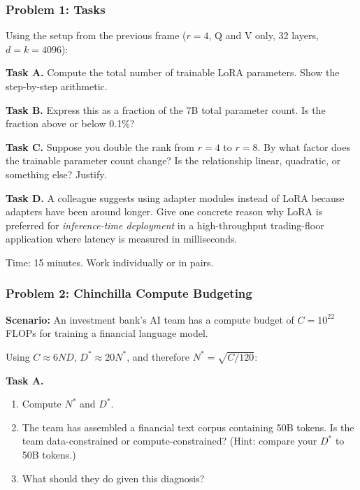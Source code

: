 \documentclass[9pt,t]{beamer}
\begin{document}
\begin{frame}
\frametitle{Problem 1: Tasks}

Using the setup from the previous frame ($r=4$, Q and V only, 32 layers, $d=k=4096$):

\medskip
\textbf{Task A.} Compute the total number of trainable LoRA parameters.
Show the step-by-step arithmetic.

\medskip
\textbf{Task B.} Express this as a fraction of the 7B total parameter count.
Is the fraction above or below 0.1\%?

\medskip
\textbf{Task C.} Suppose you double the rank from $r = 4$ to $r = 8$.
By what factor does the trainable parameter count change?
Is the relationship linear, quadratic, or something else? Justify.

\medskip
\textbf{Task D.} A colleague suggests using adapter modules instead of LoRA
because adapters have been around longer. Give one concrete reason why LoRA
is preferred for \emph{inference-time deployment} in a high-throughput
trading-floor application where latency is measured in milliseconds.

\medskip
\begin{block}{Time: 15 minutes. Work individually or in pairs.}
\end{block}
\end{frame}

\begin{frame}
\frametitle{Problem 2: Chinchilla Compute Budgeting}

\textbf{Scenario:} An investment bank's AI team has a compute budget of
$C = 10^{22}$ FLOPs for training a financial language model.

\medskip
Using $C \approx 6ND$, $D^* \approx 20 N^*$, and therefore $N^* = \sqrt{C/120}$:

\medskip
\textbf{Task A.}
\begin{enumerate}
  \item Compute $N^*$ and $D^*$.
  \item The team has assembled a financial text corpus containing 50B tokens.
        Is the team data-constrained or compute-constrained?
        (Hint: compare your $D^*$ to 50B tokens.)
  \item What should they do given this diagnosis?
\end{enumerate}
\end{frame}
\end{document}
